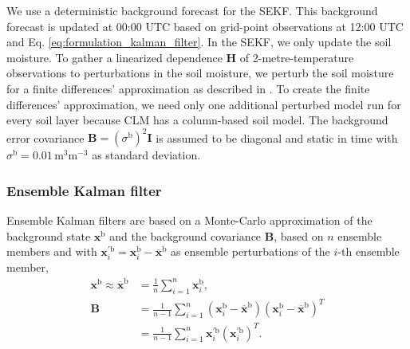 \documentclass[hess, manuscript]{copernicus}
\begin{document}
We use a deterministic background forecast for the SEKF.
This background forecast is updated at 00:00 UTC based on grid-point observations at 12:00 UTC and Eq. \eqref{eq:formulation_kalman_filter}.
In the SEKF, we only update the soil moisture.
To gather a linearized dependence $\mathbf{H}$ of 2-metre-temperature observations to perturbations in the soil moisture, we perturb the soil moisture for a finite differences' approximation as described in \citet{hess_assimilation_2001,rosnay_simplified_2013}.
To create the finite differences' approximation, we need only one additional perturbed model run for every soil layer because CLM has a column-based soil model.
The background error covariance $\mathbf{B} = (\sigma^\text{b})^2 \mathbf{I}$ is assumed to be diagonal and static in time with $\sigma^\text{b} = 0.01\,\text{m}^3 \text{m}^{-3}$ as standard deviation.

\subsubsection{Ensemble Kalman filter}

Ensemble Kalman filters are based on a Monte-Carlo approximation of the background state $\mathbf{x}^\text{b}$ and the background covariance $\mathbf{B}$, based on $n$ ensemble members and with $\mathbf{x}^{\prime\text{b}}_{i}=\mathbf{x}^\text{b}_{i} - \overline{\mathbf{x}}^\text{b}$ as ensemble perturbations of the $i$-th ensemble member,
\begin{align}
	\mathbf{x}^\text{b} \approx \overline{\mathbf{x}}^\text{b} &=
	\frac{1}{n}\sum_{i=1}^{n} \mathbf{x}^\text{b}_{i},\label{eq:ens_approx_mean}\\
	\mathbf{B} &=
	\frac{1}{n-1}\sum_{i=1}^{n} (\mathbf{x}^\text{b}_{i} - \overline{\mathbf{x}}^\text{b})(\mathbf{x}^\text{b}_{i} - \overline{\mathbf{x}}^\text{b})^{T}\label{eq:ens_approx_cov}\\
	&= \frac{1}{n-1}\sum_{i=1}^{n} \mathbf{x}^{\prime\text{b}}_{i} (\mathbf{x}^{\prime\text{b}}_{i})^{T}.\nonumber
\end{align}
\end{document}
